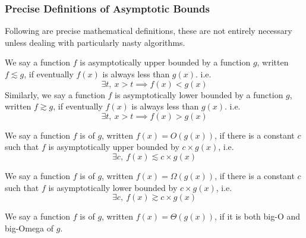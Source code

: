 \documentclass[11pt]{report}
\begin{document}
\subsubsection{Precise Definitions of Asymptotic Bounds}
Following are precise mathematical definitions, these are not entirely necessary unless dealing with particularly nasty algorithms.
\begin{defi}
    We say a function $f$ is asymptotically upper bounded by a function $g$, written $f \lesssim g$, if eventually $f(x)$ is always less than $g(x)$. i.e.
    \[\exists t, \ x > t \implies f(x) < g(x) \]
    Similarly, we say a function $f$ is asymptotically lower bounded by a function $g$, written $f \gtrsim g$, if eventually $f(x)$ is always less than $g(x)$. i.e.
    \[\exists t, \ x > t \implies f(x) > g(x) \]
\end{defi}
\begin{defi}
    [Big-O]
    We say a function $f$ is  of $g$, written $f(x) = O(g(x))$, if there is a constant $c$ such that $f$ is asymptotically upper bounded by $c\times g(x)$, i.e.
    \[\exists c, \ f(x) \lesssim c \times g(x) \]
\end{defi}
\begin{defi}
    We say a function $f$ is  of $g$, written $f(x) = \Omega(g(x))$, if there is a constant $c$ such that $f$ is asymptotically lower bounded by $c\times g(x)$, i.e.
    \[\exists c, \ f(x) \gtrsim c \times g(x) \]
\end{defi}
\begin{defi}
    We say a function $f$ is  of $g$, written $f(x) = \Theta(g(x))$, if it is both big-O and big-Omega of $g$.
\end{defi}
\pagebreak
\end{document}
